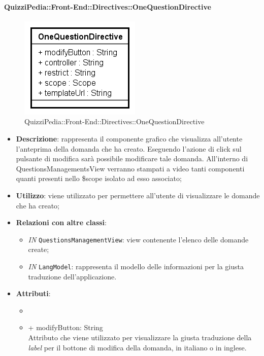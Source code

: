 \paragraph{QuizziPedia::Front-End::Directives::OneQuestionDirective}

\label{QuizziPedia::Front-End::Directives::OneQuestionDirective}

\begin{figure}[ht]
	\centering
	\includegraphics[scale=0.80,keepaspectratio]{UML/Classi/Front-End/QuizziPedia_Front-end_Directives_OneQuestionDirective.png}
	\caption{QuizziPedia::Front-End::Directives::OneQuestionDirective}
\end{figure} 
\FloatBarrier

\begin{itemize}
	\item \textbf{Descrizione}: rappresenta il componente grafico che visualizza all'utente l'anteprima della domanda che ha creato. Eseguendo l'azione di click sul pulsante di modifica sarà possibile modificare tale domanda. All'interno di QuestionsManagementsView verranno stampati a video tanti componenti quanti presenti nello \$scope isolato ad esso associato;
	\item \textbf{Utilizzo}: viene utilizzato per permettere all'utente di visualizzare le domande che ha creato;
	\item \textbf{Relazioni con altre classi}: 
	\begin{itemize}
		\item \textit{IN} \texttt{QuestionsManagementView}: view contenente l'elenco delle domande create;
		\item \textit{IN} \texttt{LangModel}: rappresenta il modello delle informazioni per la giusta traduzione dell'applicazione. 
	\end{itemize}
	\item \textbf{Attributi}: 
	\begin{itemize}
		\item \item {+ modifyButton: String} \\ Attributo che viene utilizzato per visualizzare la giusta traduzione della \textit{label} per il bottone di modifica della domanda, in italiano o in inglese.
	\end{itemize}
\end{itemize}
